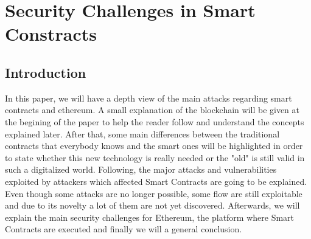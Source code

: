 \chapter{Security Challenges in Smart Constracts}


\newpage

\minitoc %

\newpage


\section{Introduction}
In this paper, we will have a depth view of the main attacks regarding smart contracts and ethereum.
A small explanation of the blockchain will be given at the begining of the paper  to help the reader follow and understand the concepts explained later.
After that, some main differences between the traditional contracts that everybody knows and the smart ones will be highlighted in order to state whether this new technology is really needed or the "old" is still valid in such a digitalized world.
Following, the major attacks and vulnerabilities exploited by attackers which affected Smart Contracts are going to be explained. Even though some attacks are no longer possible, some flow are still exploitable and due to its novelty a lot of them are not yet discovered. 
Afterwards, we will explain the main security challenges for Ethereum, the platform where Smart Contracts are executed and finally we will a general conclusion.

